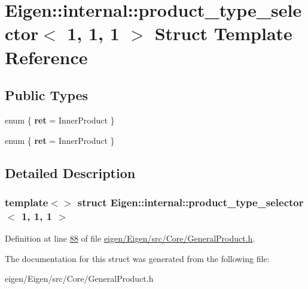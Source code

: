 \hypertarget{struct_eigen_1_1internal_1_1product__type__selector_3_011_00_011_00_011_01_4}{}\section{Eigen\+:\+:internal\+:\+:product\+\_\+type\+\_\+selector$<$ 1, 1, 1 $>$ Struct Template Reference}
\label{struct_eigen_1_1internal_1_1product__type__selector_3_011_00_011_00_011_01_4}
\subsection*{Public Types}
\begin{DoxyCompactItemize}
\item 
\mbox{\label{struct_eigen_1_1internal_1_1product__type__selector_3_011_00_011_00_011_01_4_a5ad34d5cbd074df7ec8e00819c4ec48e}} 
enum \{ {\bfseries ret} = Inner\+Product
 \}
\item 
\mbox{\label{struct_eigen_1_1internal_1_1product__type__selector_3_011_00_011_00_011_01_4_a4becbc27737d8828ea78022a49db18eb}} 
enum \{ {\bfseries ret} = Inner\+Product
 \}
\end{DoxyCompactItemize}


\subsection{Detailed Description}
\subsubsection*{template$<$$>$\newline
struct Eigen\+::internal\+::product\+\_\+type\+\_\+selector$<$ 1, 1, 1 $>$}



Definition at line \hyperlink{eigen_2_eigen_2src_2_core_2_general_product_8h_source_l00088}{88} of file \hyperlink{eigen_2_eigen_2src_2_core_2_general_product_8h_source}{eigen/\+Eigen/src/\+Core/\+General\+Product.\+h}.



The documentation for this struct was generated from the following file\+:\begin{DoxyCompactItemize}
\item 
eigen/\+Eigen/src/\+Core/\+General\+Product.\+h\end{DoxyCompactItemize}
